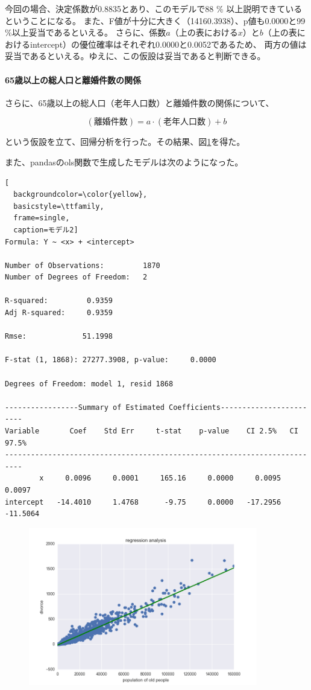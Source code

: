 \documentclass[a4paper,xelatex,ja=standard,jafont=hiragino-pron, 10pt]{bxjsarticle}
\begin{document}
今回の場合、決定係数が0.8835とあり、このモデルで88 $\%$ 以上説明できているということになる。
また、F値が十分に大きく（14160.3938）、p値も0.0000と99$\%$以上妥当であるといえる。
さらに、係数$a$（上の表における$x$）と$b$（上の表におけるintercept）の優位確率はそれぞれ0.0000と0.0052であるため、
両方の値は妥当であるといえる。ゆえに、この仮設は妥当であると判断できる。

\paragraph{65歳以上の総人口と離婚件数の関係}

さらに、65歳以上の総人口（老年人口数）と離婚件数の関係について、

\begin{equation}
  (\mbox{離婚件数}) = a \cdot (\mbox{老年人口数}) + b
\end{equation}

という仮設を立て、回帰分析を行った。その結果、図\ref{regression_od}を得た。

また、pandasのols関数で生成したモデルは次のようになった。

\begin{lstlisting}[
  backgroundcolor=\color{yellow},
  basicstyle=\ttfamily,
  frame=single,
  caption=モデル2]
Formula: Y ~ <x> + <intercept>

Number of Observations:         1870
Number of Degrees of Freedom:   2

R-squared:         0.9359
Adj R-squared:     0.9359

Rmse:             51.1998

F-stat (1, 1868): 27277.3908, p-value:     0.0000

Degrees of Freedom: model 1, resid 1868

-----------------Summary of Estimated Coefficients------------------------
Variable       Coef    Std Err     t-stat    p-value    CI 2.5%   CI 97.5%
--------------------------------------------------------------------------
        x     0.0096     0.0001     165.16     0.0000     0.0095     0.0097
intercept   -14.4010     1.4768      -9.75     0.0000   -17.2956   -11.5064
\end{lstlisting}

\begin{figure}[!h]
  \centering
  \includegraphics[clip, width=10.0cm]{../data/picture/regression_od.png}
  \caption{}
  \label{regression_od}
\end{figure}
\end{document}
